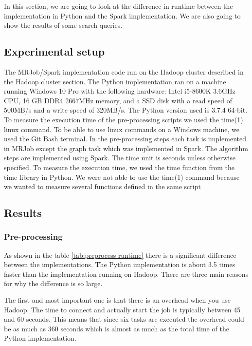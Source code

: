 
In this section, we are going to look at the difference in runtime between the implementation in Python and the Spark implementation. We are also going to show the results of some search queries.



\subsection{Experimental setup}

The MRJob/Spark implementation code ran on the Hadoop cluster described in the Hadoop cluster section. The Python implementation ran on a machine running Windows 10 Pro with the following hardware: Intel i5-8600K 3.6GHz CPU, 16 GB DDR4 2667MHz memory, and a SSD disk with a read speed of 500MB/s and a write speed of 320MB/s. The Python version used is 3.7.4 64-bit. To measure the execution time of the pre-processing scripts we used the time(1)\cite{Time1} linux command. To be able to use linux commands on a Windows machine, we used the Git Bash terminal\cite{GitBash}. In the pre-processing steps each task is implemented in MRJob except the graph task which was implemented in Spark. The algorithm steps are implemented using Spark. The time unit is seconds unless otherwise specified. To measure the execution time, we used the time function from the time library in Python. We were not able to use the time(1) command because we wanted to measure several functions defined in the same script



\subsection{Results}

\subsubsection{Pre-processing}

As shown in the table \ref{tab:preprocess runtime} there is a significant difference between the implementations. The Python implementation is about 3.5 times faster than the implementation running on Hadoop. There are three main reasons for why the difference is so large.
 
The first and most important one is that there is an overhead when you use Hadoop. The time to connect and actually start the job is typically between 45 and 60 seconds. This means that since six tasks are executed the overhead could be as much as 360 seconds which is almost as much as the total time of the Python implementation. 

